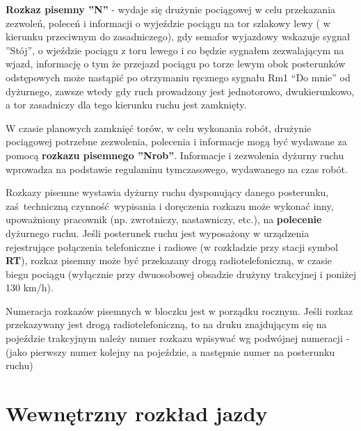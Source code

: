 \textbf{Rozkaz pisemny ''N'' } - wydaje się drużynie pociągowej w celu przekazania zezwoleń, poleceń i informacji o wyjeździe pociągu na tor szlakowy lewy ( w kierunku przeciwnym do zasadniczego), gdy semafor wyjazdowy wskazuje sygnał ''Stój'', o wjeździe pociągu z toru lewego i co będzie sygnałem zezwalającym na wjazd, informację o tym że przejazd pociągu po torze lewym obok posterunków odstępowych może nastąpić po otrzymaniu ręcznego sygnału Rm1 “Do mnie” od dyżurnego, zawsze wtedy gdy ruch prowadzony jest jednotorowo, dwukierunkowo, a tor zasadniczy dla tego kierunku ruchu  jest zamknięty.

W czasie planowych zamknięć torów, w celu wykonania robót, drużynie pociągowej potrzebne zezwolenia, polecenia i informacje mogą być wydawane za pomocą \textbf{rozkazu pisemnego ''Nrob''}. Informacje i zezwolenia dyżurny ruchu wprowadza na podstawie regulaminu tymczasowego, wydawanego na czas robót.

Rozkazy pisemne wystawia dyżurny ruchu dysponujący danego posterunku, zaś techniczną czynność wypisania i doręczenia rozkazu może wykonać inny, upoważniony pracownik (np. zwrotniczy, nastawniczy, etc.), na \textbf{polecenie} dyżurnego ruchu. Jeśli posterunek ruchu jest wyposażony w urządzenia rejestrujące połączenia telefoniczne i radiowe (w rozkładzie przy stacji symbol \textbf{RT}), rozkaz pisemny może być przekazany drogą radiotelefoniczną, w czasie biegu pociągu (wyłącznie przy dwuosobowej obsadzie drużyny trakcyjnej i poniżej 130 km/h).

Numeracja rozkazów pisemnych w bloczku jest w porządku rocznym. Jeśli rozkaz przekazywany jest drogą radiotelefoniczną, to na druku znajdującym się na pojeździe trakcyjnym należy numer rozkazu wpisywać wg podwójnej numeracji - (jako pierwszy numer kolejny na pojeździe, a następnie numer na posterunku ruchu)

\chapter{Wewnętrzny rozkład jazdy}

